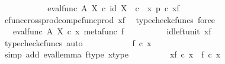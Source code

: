 \begin{isabellebody}
\ \ \ \ \ \ \isamarkupfalse%
\ \isamarkupfalse%
\ {\isachardoublequoteopen}{\isachardot}{\kern0pt}{\isachardot}{\kern0pt}{\isachardot}{\kern0pt}\ {\isacharequal}{\kern0pt}\ {\isacharparenleft}{\kern0pt}eval{\isacharunderscore}{\kern0pt}func\ A\ X{\isacharparenright}{\kern0pt}\ {\isasymcirc}\isactrlsub c\ {\isasymlangle}id\ X\ \ {\isasymcirc}\isactrlsub c\ \ x{\isacharcomma}{\kern0pt}\ p\ {\isasymcirc}\isactrlsub c\ x{\isacharunderscore}{\kern0pt}f{\isasymrangle}{\isachardoublequoteclose}\isanewline
\ \ \ \ \ \ \ \ \isamarkupfalse%
\ cfunc{\isacharunderscore}{\kern0pt}cross{\isacharunderscore}{\kern0pt}prod{\isacharunderscore}{\kern0pt}comp{\isacharunderscore}{\kern0pt}cfunc{\isacharunderscore}{\kern0pt}prod\ x{\isacharunderscore}{\kern0pt}f\ \isamarkupfalse%
\ {\isacharparenleft}{\kern0pt}typecheck{\isacharunderscore}{\kern0pt}cfuncs{\isacharcomma}{\kern0pt}\ force{\isacharparenright}{\kern0pt}\isanewline
\ \ \ \ \ \ \isamarkupfalse%
\ \isamarkupfalse%
\ {\isachardoublequoteopen}{\isachardot}{\kern0pt}{\isachardot}{\kern0pt}{\isachardot}{\kern0pt}\ {\isacharequal}{\kern0pt}\ {\isacharparenleft}{\kern0pt}eval{\isacharunderscore}{\kern0pt}func\ A\ X{\isacharparenright}{\kern0pt}\ {\isasymcirc}\isactrlsub c\ {\isasymlangle}x{\isacharcomma}{\kern0pt}\ metafunc\ f{\isasymrangle}{\isachardoublequoteclose}\isanewline
\ \ \ \ \ \ \ \ \isamarkupfalse%
\ id{\isacharunderscore}{\kern0pt}left{\isacharunderscore}{\kern0pt}unit{}\ x{\isacharunderscore}{\kern0pt}f\ \isamarkupfalse%
\ {\isacharparenleft}{\kern0pt}typecheck{\isacharunderscore}{\kern0pt}cfuncs{\isacharcomma}{\kern0pt}\ auto{\isacharparenright}{\kern0pt}\isanewline
\ \ \ \ \ \ \isamarkupfalse%
\ \isamarkupfalse%
\ {\isachardoublequoteopen}{\isachardot}{\kern0pt}{\isachardot}{\kern0pt}{\isachardot}{\kern0pt}\ {\isacharequal}{\kern0pt}\ f\ {\isasymcirc}\isactrlsub c\ x{\isachardoublequoteclose}\isanewline
\ \ \ \ \ \ \ \ \isamarkupfalse%
\ {\isacharparenleft}{\kern0pt}simp\ add{\isacharcolon}{\kern0pt}\ eval{\isacharunderscore}{\kern0pt}lemma\ f{\isacharunderscore}{\kern0pt}type\ x{\isacharunderscore}{\kern0pt}type{\isacharparenright}{\kern0pt}\isanewline
\ \ \ \ \ \ \isamarkupfalse%
\ \isamarkupfalse%
\ {\isachardoublequoteopen}{\isasymphi}\isactrlbsub {\isacharbrackleft}{\kern0pt}{\isacharminus}{\kern0pt}{\isacharcomma}{\kern0pt}x{\isacharunderscore}{\kern0pt}f{\isacharbrackright}{\kern0pt}\isactrlesub \ {\isasymcirc}\isactrlsub c\ x\ {\isacharequal}{\kern0pt}\ f\ {\isasymcirc}\isactrlsub c\ x{\isachardoublequoteclose}\isanewline

\end{isabellebody}
